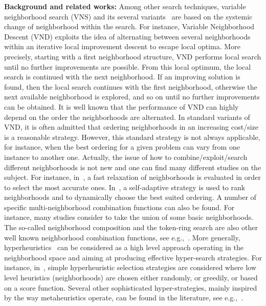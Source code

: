 \documentclass{acm_proc_article-sp}
\begin{document}
\textbf{Background and related works:}
Among other search techniques, variable neighborhood search (VNS) and its several variants~\cite{VNS} are based on the systemic change of neighborhood within the search. For instance, Variable Neighborhood Descent (VND) exploits the idea of alternating between several neighborhoods within an iterative local improvement descent to escape local optima. More precisely, starting with a first neighborhood structure, VND performs local search until no further improvements are possible. From this local optimum, the local search is continued with the next neighborhood. If an improving solution is found, then the local search continues with the first neighborhood, otherwise the next available neighborhood is explored, and so on until no further improvements can be obtained. It is well known that the performance of VND can highly depend on the order the neighborhoods are alternated. In standard variants of VND, it is often admitted that ordering neighborhoods in an increasing cost/size is a reasonable strategy. However, this standard strategy is not always applicable, for instance, when the best ordering for a given problem can vary from one instance to another one. Actually, the issue of how to combine/exploit/search different neighborhoods is not new and one can find many different studies on the subject. For instance, in~\cite{PR}, a fast relaxation of neighborhoods is evaluated in order to select the most accurate ones. In~\cite{HR}, a self-adaptive strategy is used to rank neighborhoods and to dynamically choose the best suited ordering. A number of specific multi-neighborhood combination functions can also be found. For instance, many studies consider to take the union of some basic neighborhoods. The so-called neighborhood composition and the token-ring search are also other well known neighborhood combination functions, see e.g.,~\cite{LKG,GS,GMK,LGH}. More generally, hyperheuristics~\cite{Hyp} can be considered as a high level approach operating in the neighborhood space and aiming at producing effective hyper-search strategies. For instance, in~\cite{Cow,Ozcan}, simple hyperheuristic selection strategies are considered where low level heuristics (neighborhoods) are chosen either randomly, or greedily, or based on a score function. Several other sophisticated hyper-strategies, mainly inspired by the way metaheuristics operate, can be found in the literature, see e.g.,~\cite{Hyp2}.
\end{document}
